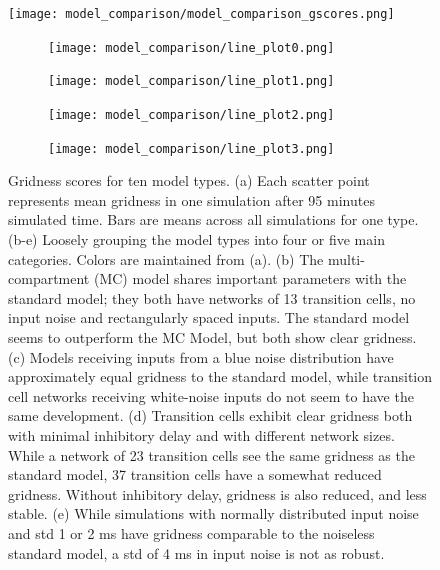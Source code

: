\documentclass{article}
\begin{document}
    \begin{figure}[H]
        \centering  
        \begin{minipage}[b]{1\textwidth}
            \centering
            \subcaption{}
            \texttt{[image: model\_comparison/model\_comparison\_gscores.png]}
        \end{minipage}
        \begin{minipage}[t]{1\textwidth}
            \begin{subfigure}{0.5\textwidth}
                \subcaption{}
                \texttt{[image: model\_comparison/line\_plot0.png]}
            \end{subfigure}
            \begin{subfigure}{0.5\textwidth}
                \subcaption{}
                \texttt{[image: model\_comparison/line\_plot1.png]}
            \end{subfigure}
            \begin{subfigure}{0.5\textwidth}
                \subcaption{}
                \texttt{[image: model\_comparison/line\_plot2.png]}
            \end{subfigure}
            \begin{subfigure}{0.5\textwidth}
                \subcaption{}
                \texttt{[image: model\_comparison/line\_plot3.png]}
            \end{subfigure}
        \end{minipage}
        \caption{Gridness scores for ten model types. (a) Each scatter point represents mean gridness in one simulation after 95 minutes simulated time. Bars are means across all simulations for one type. (b-e) Loosely grouping the model types into four or five main categories. Colors are maintained from (a). (b) The multi-compartment (MC) model shares important parameters with the standard model; they both have networks of 13 transition cells, no input noise and rectangularly spaced inputs. The standard model seems to outperform the MC Model, but both show clear gridness. (c) Models receiving inputs from a blue noise distribution have approximately equal gridness to the standard model, while transition cell networks receiving white-noise inputs do not seem to have the same development. (d) Transition cells exhibit clear gridness both with minimal inhibitory delay and with different network sizes. While a network of 23 transition cells see the same gridness as the standard model, 37 transition cells have a somewhat reduced gridness. Without inhibitory delay, gridness is also reduced, and less stable. (e) While simulations with normally distributed input noise and std 1 or 2 ms have gridness comparable to the noiseless standard model, a std of 4 ms in input noise is not as robust.}
        \label{gridness_plots}
    \end{figure}
    
\end{document}
